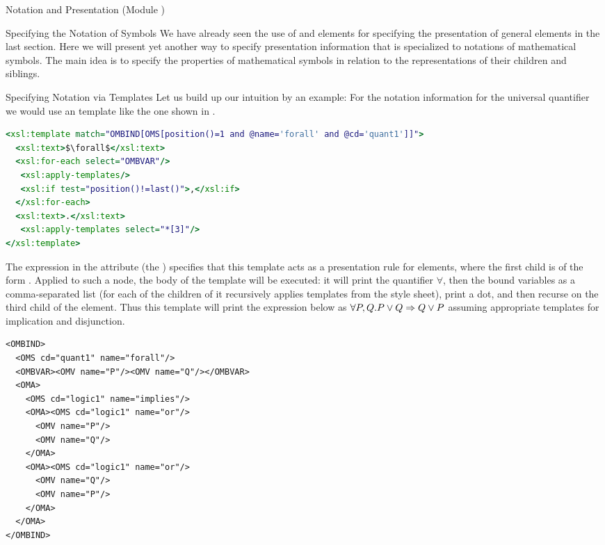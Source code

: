 \begin{tchapter}[id=pres,short=Notation and Presentation]{Notation and Presentation (Module {})}
\begin{tsection}[id=presentation,short=Notation of Symbols]{Specifying the Notation of Symbols}
  We have already seen the use of {} and {} elements for
  specifying the presentation of general {\omdoc} elements in the last section. Here we
  will present yet another way to specify presentation information that is specialized to
  notations of mathematical symbols.  The main idea is to specify the properties of
  mathematical symbols in relation to the representations of their children and siblings.
  
\begin{tsubsection}[id=pres-templates]{Specifying Notation via Templates}
  Let us build up our intuition by an example: For the notation information for the
  universal quantifier we would use an {\xslt} template like the one shown in
  {}.
\begin{lstlisting}[label=lst:template,language=XSLT,
  caption={An {\xslt} Template for the Universal Quantifier},mathescape,
  index={xsl:template,xsl:text,xsl:for-each,xsl:apply-templates,xsl:if}]
<xsl:template match="OMBIND[OMS[position()=1 and @name='forall' and @cd='quant1']]">
  <xsl:text>$\forall$</xsl:text>
  <xsl:for-each select="OMBVAR"/>
   <xsl:apply-templates/>
   <xsl:if test="position()!=last()">,</xsl:if>
  </xsl:for-each>
  <xsl:text>.</xsl:text>
   <xsl:apply-templates select="*[3]"/>
</xsl:template>
\end{lstlisting}
  The {\xpath} expression in the {} attribute (the
  {}) specifies that this template acts as a presentation rule for
  {} elements, where the first child is of the form
  {}. Applied to such a node, the body of the
  template will be executed: it will print the quantifier $\forall$, then the bound
  variables as a comma-separated list (for each of the children of
  {} it recursively applies {\xslt} templates from the style
  sheet), print a dot, and then recurse on the third child of the
  {} element.  Thus this template will print the {\openmath}
  expression below as ${\forall{P,Q}.{P\vee Q\Rightarrow Q\vee P}}$ assuming appropriate
  templates for implication and disjunction.

\begin{lstlisting}[label=lst:or-comm,index={OMBIND,OMS,OMBVAR,OMV,OMA}]
<OMBIND>
  <OMS cd="quant1" name="forall"/>
  <OMBVAR><OMV name="P"/><OMV name="Q"/></OMBVAR>
  <OMA>
    <OMS cd="logic1" name="implies"/>
    <OMA><OMS cd="logic1" name="or"/>
      <OMV name="P"/>
      <OMV name="Q"/>
    </OMA>
    <OMA><OMS cd="logic1" name="or"/>
      <OMV name="Q"/>
      <OMV name="P"/>
    </OMA>
  </OMA>
</OMBIND>
\end{lstlisting}


\end{tsubsection}
\end{tsection}
\end{tchapter}
